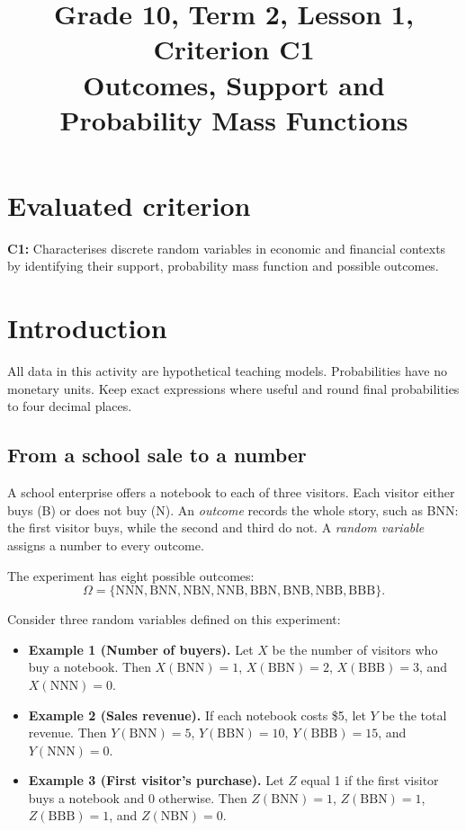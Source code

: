 \makeatletter
{}
\makeatother


\usepackage{needspace}
\setlength{\emergencystretch}{2em}
\title{Grade 10, Term 2, Lesson 1, Criterion C1\\Outcomes, Support and Probability Mass Functions}
\author{}
\date{}

\maketitle
\setcounter{tocdepth}{1}
\setcounter{secnumdepth}{2}
\label{toc}
\tableofcontents
\section*{Evaluated criterion}
\textbf{C1:} Characterises discrete random variables in economic and financial contexts by identifying their support, probability mass function and possible outcomes.
\section{Introduction}\label{sec:t2-c1-introduction}
All data in this activity are hypothetical teaching models. Probabilities have no monetary units. Keep exact expressions where useful and round final probabilities to four decimal places.

\subsection{From a school sale to a number}

A school enterprise offers a notebook to each of three visitors. Each visitor either buys (B) or does not buy (N). An \emph{outcome} records the whole story, such as BNN: the first visitor buys, while the second and third do not. A \emph{random variable} assigns a number to every outcome.

The experiment has eight possible outcomes:
\[
\Omega=\{\mathrm{NNN},\mathrm{BNN},\mathrm{NBN},\mathrm{NNB},
\mathrm{BBN},\mathrm{BNB},\mathrm{NBB},\mathrm{BBB}\}.
\]

Consider three random variables defined on this experiment:

\begin{itemize}
	\item \textbf{Example 1 (Number of buyers).}
	Let $X$ be the number of visitors who buy a notebook.
	Then $X(\mathrm{BNN})=1$, $X(\mathrm{BBN})=2$,
	$X(\mathrm{BBB})=3$, and $X(\mathrm{NNN})=0$.
	
	\item \textbf{Example 2 (Sales revenue).}
	If each notebook costs \$5, let $Y$ be the total revenue.
	Then $Y(\mathrm{BNN})=5$, $Y(\mathrm{BBN})=10$,
	$Y(\mathrm{BBB})=15$, and $Y(\mathrm{NNN})=0$.
	
	\item \textbf{Example 3 (First visitor's purchase).}
	Let $Z$ equal 1 if the first visitor buys a notebook
	and 0 otherwise. Then $Z(\mathrm{BNN})=1$,
	$Z(\mathrm{BBN})=1$, $Z(\mathrm{BBB})=1$,
	and $Z(\mathrm{NBN})=0$.
\end{itemize}


